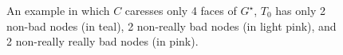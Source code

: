 \documentclass{patmorin}
\newcommand{\dual}[1]{{#1}^\star}
\begin{document}
\begin{figure}
    \caption{An example in which $C$ caresses only 4 faces of $\dual{G}$, $T_0$ has only 2 non-bad nodes (in teal), 2 non-really bad nodes (in light pink), and 2 non-really really bad nodes (in pink).}
\end{figure}
%
%
%
%
%
%
\end{document}
